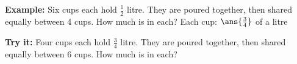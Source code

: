 \documentclass[12pt]{article}
\begin{document}
\begin{examplebox}
\textbf{Example:} \quad Six cups each hold $\frac{1}{2}$ litre. They are poured together, then shared equally between 4 cups. How much is in each?
Each cup: $\ans{\tfrac{3}{4}}$ of a litre
\end{examplebox}

\begin{tryitbox}
\textbf{Try it:} \quad Four cups each hold $\frac{3}{4}$ litre. They are poured together, then shared equally between 6 cups. How much is in each?\\[2pt]
\end{tryitbox}
\end{document}
